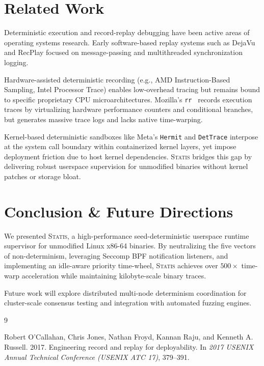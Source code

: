 \documentclass[twocolumn,10pt,sigconf,nonacm]{acmart}
\begin{document}
\section{Related Work}

Deterministic execution and record-replay debugging have been active areas of operating systems research. Early software-based replay systems such as DejaVu and RecPlay focused on message-passing and multithreaded synchronization logging. 

Hardware-assisted deterministic recording (e.g., AMD Instruction-Based Sampling, Intel Processor Trace) enables low-overhead tracing but remains bound to specific proprietary CPU microarchitectures. Mozilla's \texttt{rr}~\cite{rr} records execution traces by virtualizing hardware performance counters and conditional branches, but generates massive trace logs and lacks native time-warping.

Kernel-based deterministic sandboxes like Meta's \texttt{Hermit} and \texttt{DetTrace} interpose at the system call boundary within containerized kernel layers, yet impose deployment friction due to host kernel dependencies. \textsc{Statis} bridges this gap by delivering robust userspace supervision for unmodified binaries without kernel patches or storage bloat.

\section{Conclusion \& Future Directions}

We presented \textsc{Statis}, a high-performance seed-deterministic userspace runtime supervisor for unmodified Linux x86-64 binaries. By neutralizing the five vectors of non-determinism, leveraging Seccomp BPF notification listeners, and implementing an idle-aware priority time-wheel, \textsc{Statis} achieves over $500\times$ time-warp acceleration while maintaining kilobyte-scale binary traces. 

Future work will explore distributed multi-node determinism coordination for cluster-scale consensus testing and integration with automated fuzzing engines.


\begin{thebibliography}{9}

Robert O'Callahan, Chris Jones, Nathan Froyd, Kannan Raju, and Kenneth A. Russell. 2017.
\newblock Engineering record and replay for deployability.
\newblock In \emph{2017 USENIX Annual Technical Conference (USENIX ATC 17)}, 379--391.

\end{thebibliography}
\end{document}
